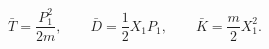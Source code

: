 \begin{equation}
\bar T=\frac{P_1^2}{2m},\qquad
\bar D=\frac{1}{2}X_1P_1,\qquad
\bar K=\frac{m}{2}X_1^2.
\label{intbar}
\end{equation}

